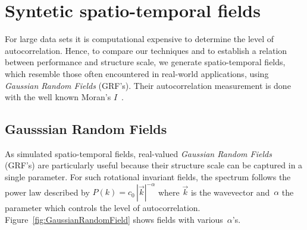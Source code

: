 \documentclass[ijgi,article,submit,moreauthors,pdftex,10pt,a4paper]{Definitions/mdpi}
\begin{document}
\section{Syntetic spatio-temporal fields}
\label{sec:Syntetic spatio-temporal fields}

For large data sets it is computational expensive to determine the level of autocorrelation. Hence, to compare our techniques and to establish a relation between performance and structure scale, we generate spatio-temporal fields, which resemble those often encountered in real-world applications, using \textit{Gaussian Random Fields} (GRF's). Their autocorrelation measurement is done with the well known Moran's $I$~\cite{Moran1950, Hubert1981, PySAL}.

\subsection{Gausssian Random Fields}
\label{sec:Autocorrelation/Gausssian Random Fields}
As simulated spatio-temporal fields, real-valued \textit{Gaussian Random Fields} (GRF's) are particularly useful because their structure scale can be captured in a single parameter. For such rotational invariant fields, the spectrum follows the power law described by $P(k) = c_{0} \, |\vec{k}|^{-\alpha}$ where $\vec{k}$ is the wavevector and~$\alpha$ the parameter which controls the level of autocorrelation. Figure~\ref{fig:GaussianRandomField} shows fields with various~$\alpha$'s.
\end{document}
